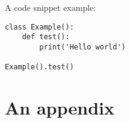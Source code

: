 \documentclass[minted]{cpa-thesis}
\begin{document}
    A code snippet example:
    \begin{verbatim}
class Example():
    def test():
        print('Hello world')

Example().test()
    \end{verbatim}

    \appendix

    \chapter{An appendix}

    \blindtext

    \printbibliography
\end{document}
